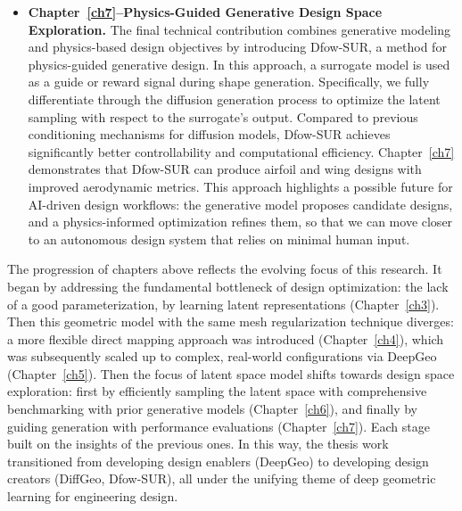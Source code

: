 \begin{itemize}
    \item \textbf{Chapter~\ref{ch7}--Physics-Guided Generative Design Space Exploration.} The final technical contribution combines generative modeling and physics-based design objectives by introducing Dfow-SUR, a method for physics-guided generative design. In this approach, a surrogate model is used as a guide or reward signal during shape generation. Specifically, we fully differentiate through the diffusion generation process to optimize the latent sampling with respect to the surrogate’s output. Compared to previous conditioning mechanisms for diffusion models, Dfow-SUR achieves significantly better controllability and computational efficiency. Chapter~\ref{ch7} demonstrates that Dfow-SUR can produce airfoil and wing designs with improved aerodynamic metrics. This approach highlights a possible future for AI-driven design workflows: the generative model proposes candidate designs, and a physics-informed optimization refines them, so that we can move closer to an autonomous design system that relies on minimal human input.
\end{itemize}

The progression of chapters above reflects the evolving focus of this research. It began by addressing the fundamental bottleneck of design optimization: the lack of a good parameterization, by learning latent representations (Chapter~\ref{ch3}). Then this geometric model with the same mesh regularization technique diverges: a more flexible direct mapping approach was introduced (Chapter~\ref{ch4}), which was subsequently scaled up to complex, real-world configurations via DeepGeo (Chapter~\ref{ch5}). Then the focus of latent space model shifts towards design space exploration: first by efficiently sampling the latent space with comprehensive benchmarking with prior generative models (Chapter~\ref{ch6}), and finally by guiding generation with performance evaluations (Chapter~\ref{ch7}). Each stage built on the insights of the previous ones. In this way, the thesis work transitioned from developing design enablers (DeepGeo) to developing design creators (DiffGeo, Dfow-SUR), all under the unifying theme of deep geometric learning for engineering design. 

